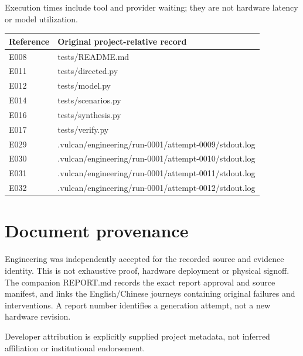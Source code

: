 \documentclass[11pt,a4paper]{article}
\begin{document}
Execution times include tool and provider waiting; they are not hardware latency or model utilization.

{\small\begin{longtable}{@{}L{0.12\textwidth}L{0.82\textwidth}@{}}\toprule

\textbf{Reference} & \textbf{Original project-relative record}\\\midrule\endhead

E008 & tests/\allowbreak{}README.md\\[3pt]

E011 & tests/\allowbreak{}directed.py\\[3pt]

E012 & tests/\allowbreak{}model.py\\[3pt]

E014 & tests/\allowbreak{}scenarios.py\\[3pt]

E016 & tests/\allowbreak{}synthesis.py\\[3pt]

E017 & tests/\allowbreak{}verify.py\\[3pt]

E029 & .vulcan/\allowbreak{}engineering/\allowbreak{}run-0001/\allowbreak{}attempt-0009/\allowbreak{}stdout.log\\[3pt]

E030 & .vulcan/\allowbreak{}engineering/\allowbreak{}run-0001/\allowbreak{}attempt-0010/\allowbreak{}stdout.log\\[3pt]

E031 & .vulcan/\allowbreak{}engineering/\allowbreak{}run-0001/\allowbreak{}attempt-0011/\allowbreak{}stdout.log\\[3pt]

E032 & .vulcan/\allowbreak{}engineering/\allowbreak{}run-0001/\allowbreak{}attempt-0012/\allowbreak{}stdout.log\\[3pt]

\bottomrule\end{longtable}}

\section{Document provenance}

Engineering was independently accepted for the recorded source and evidence identity. This is not exhaustive proof, hardware deployment or physical signoff. The companion REPORT.md records the exact report approval and source manifest, and links the English/Chinese journeys containing original failures and interventions. A report number identifies a generation attempt, not a new hardware revision.

Developer attribution is explicitly supplied project metadata, not inferred affiliation or institutional endorsement.
\end{document}
